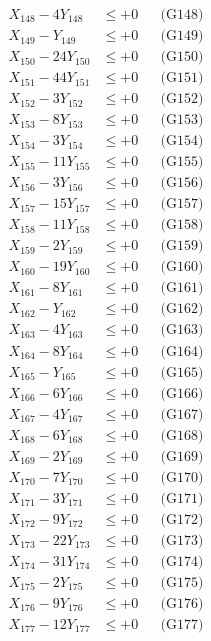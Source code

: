 \documentclass[a4paper,10pt]{article}
\begin{document}
{\begin{align}
X_{148} - 4Y_{148} &\leq +0 && \text{(G148)} \\
X_{149} - Y_{149} &\leq +0 && \text{(G149)} \\
X_{150} - 24Y_{150} &\leq +0 && \text{(G150)} \\
X_{151} - 44Y_{151} &\leq +0 && \text{(G151)} \\
X_{152} - 3Y_{152} &\leq +0 && \text{(G152)} \\
X_{153} - 8Y_{153} &\leq +0 && \text{(G153)} \\
\allowbreak
X_{154} - 3Y_{154} &\leq +0 && \text{(G154)} \\
X_{155} - 11Y_{155} &\leq +0 && \text{(G155)} \\
X_{156} - 3Y_{156} &\leq +0 && \text{(G156)} \\
X_{157} - 15Y_{157} &\leq +0 && \text{(G157)} \\
X_{158} - 11Y_{158} &\leq +0 && \text{(G158)} \\
X_{159} - 2Y_{159} &\leq +0 && \text{(G159)} \\
X_{160} - 19Y_{160} &\leq +0 && \text{(G160)} \\
X_{161} - 8Y_{161} &\leq +0 && \text{(G161)} \\
X_{162} - Y_{162} &\leq +0 && \text{(G162)} \\
X_{163} - 4Y_{163} &\leq +0 && \text{(G163)} \\
\allowbreak
X_{164} - 8Y_{164} &\leq +0 && \text{(G164)} \\
X_{165} - Y_{165} &\leq +0 && \text{(G165)} \\
X_{166} - 6Y_{166} &\leq +0 && \text{(G166)} \\
X_{167} - 4Y_{167} &\leq +0 && \text{(G167)} \\
X_{168} - 6Y_{168} &\leq +0 && \text{(G168)} \\
X_{169} - 2Y_{169} &\leq +0 && \text{(G169)} \\
X_{170} - 7Y_{170} &\leq +0 && \text{(G170)} \\
X_{171} - 3Y_{171} &\leq +0 && \text{(G171)} \\
X_{172} - 9Y_{172} &\leq +0 && \text{(G172)} \\
X_{173} - 22Y_{173} &\leq +0 && \text{(G173)} \\
\allowbreak
X_{174} - 31Y_{174} &\leq +0 && \text{(G174)} \\
X_{175} - 2Y_{175} &\leq +0 && \text{(G175)} \\
X_{176} - 9Y_{176} &\leq +0 && \text{(G176)} \\
X_{177} - 12Y_{177} &\leq +0 && \text{(G177)} \\

\end{align}}
\end{document}
